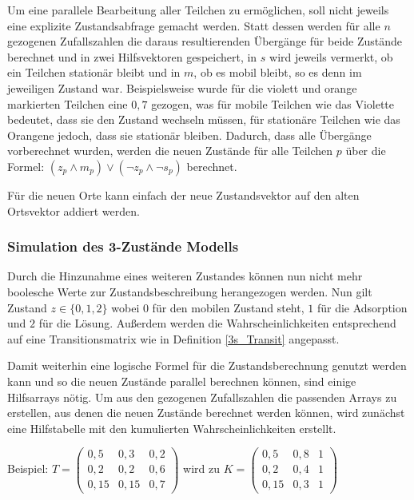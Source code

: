 Um eine parallele Bearbeitung aller Teilchen zu ermöglichen, soll nicht jeweils eine explizite Zustandsabfrage gemacht werden. Statt dessen werden für alle $n$ gezogenen Zufallszahlen die daraus resultierenden Übergänge für beide Zustände berechnet und in zwei Hilfsvektoren gespeichert, in $s$ wird jeweils vermerkt, ob ein Teilchen stationär bleibt und in $m$, ob es mobil bleibt, so es denn im jeweiligen Zustand war. Beispielsweise wurde für die violett und orange markierten Teilchen eine $0,7$ gezogen, was für mobile Teilchen wie das Violette bedeutet, dass sie den Zustand wechseln müssen, für stationäre Teilchen wie das Orangene jedoch, dass sie stationär bleiben. 
Dadurch, dass alle Übergänge vorberechnet wurden, werden die neuen Zustände für alle Teilchen $p$ über die Formel: $(z_p \land m_p) \lor (\lnot z_p \land \lnot s_p)$ berechnet. 

Für die neuen Orte kann einfach der neue Zustandsvektor auf den alten Ortsvektor addiert werden.


\subsubsection{Simulation des 3-Zustände Modells}

Durch die Hinzunahme eines weiteren Zustandes können nun nicht mehr boolesche Werte zur Zustandsbeschreibung herangezogen werden. Nun gilt Zustand $z \in \{0, 1, 2\}$  wobei $0$ für den mobilen Zustand steht, $1$ für die Adsorption und $2$ für die Lösung. Außerdem werden die Wahrscheinlichkeiten entsprechend auf eine Transitionsmatrix wie in Definition \ref{3s_Transit} angepasst.

Damit weiterhin eine logische Formel für die Zustandsberechnung genutzt werden kann und so die neuen Zustände parallel berechnen können, sind einige Hilfsarrays nötig. %
Um aus den gezogenen Zufallszahlen die passenden Arrays zu erstellen, aus denen die neuen Zustände berechnet werden können, wird zunächst eine Hilfstabelle mit den kumulierten Wahrscheinlichkeiten erstellt. %

Beispiel:
$T= 
\begin{pmatrix}
0,5 & 0,3 & 0,2 \\
0,2 & 0,2 & 0,6 \\
0,15 & 0,15 & 0,7 
\end{pmatrix}
$  wird zu 
$K= 
\begin{pmatrix}
0,5 & 0,8 & 1 \\
0,2 & 0,4 & 1 \\
0,15 & 0,3 & 1 
\end{pmatrix}
$ 

